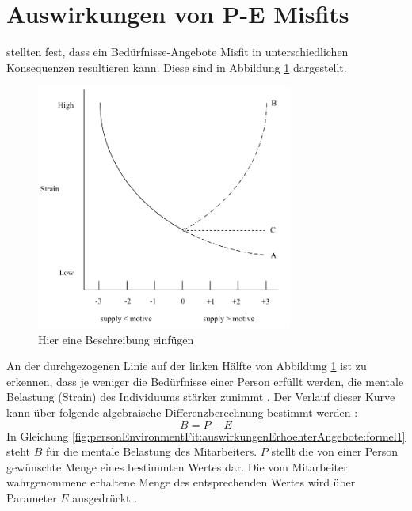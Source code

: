 \section{Auswirkungen von P-E Misfits}
\label{ch:personEnvironmentFit:auswirkungenErhoehterAngebote}
\textcite{mechanismsOfJobStressAndStrain:1982} stellten fest, dass ein Bedürfnisse-Angebote Misfit in unterschiedlichen Konsequenzen resultieren kann. Diese sind in Abbildung \ref{fig:personEnvironmentFit:auswirkungenErhoehterAngebote:abb1} dargestellt.

\begin{figure}[h]
	\centering
	\includegraphics[width=0.75\textwidth]{gfx/ueberschuss_supply_motive.png}
	\caption{Hier eine Beschreibung einfügen \cite[S. 23]{edwards:2008}}
	\label{fig:personEnvironmentFit:auswirkungenErhoehterAngebote:abb1}
\end{figure}

An der durchgezogenen Linie auf der linken Hälfte von Abbildung \ref{fig:personEnvironmentFit:auswirkungenErhoehterAngebote:abb1} ist zu erkennen, dass je weniger die Bedürfnisse einer Person erfüllt werden, die mentale Belastung (Strain) des Individuums stärker zunimmt \cite[S. 30]{mechanismsOfJobStressAndStrain:1982}. Der Verlauf dieser Kurve kann über folgende algebraische Differenzberechnung bestimmt werden \cite[S. 2]{edwards:1993}:
\begin{equation}
	B = P - E
	\label{fig:personEnvironmentFit:auswirkungenErhoehterAngebote:formel1}
\end{equation}
In Gleichung \ref{fig:personEnvironmentFit:auswirkungenErhoehterAngebote:formel1} steht $B$ für die mentale Belastung des Mitarbeiters. $P$ stellt die von einer Person gewünschte Menge eines bestimmten Wertes dar. Die vom Mitarbeiter wahrgenommene erhaltene Menge des entsprechenden Wertes wird über Parameter $E$ ausgedrückt \cite[S. 2]{edwards:1993}.

